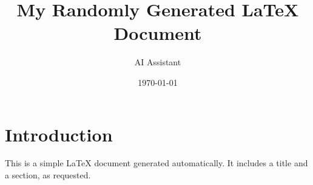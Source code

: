 \documentclass{article}
\title{My Randomly Generated LaTeX Document}
\author{AI Assistant}
\date{\today}
\begin{document}
\maketitle

\section{Introduction}
This is a simple LaTeX document generated automatically. It includes a title and a section, as requested.
\end{document}
